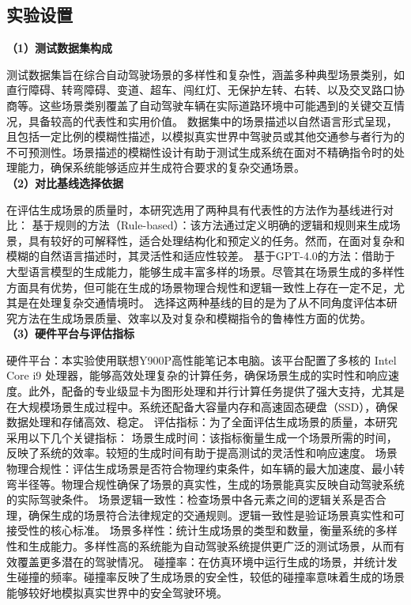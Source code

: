 \documentclass{article}
\begin{document}
\subsection{实验设置}
\textbf{（1）测试数据集构成} \par
测试数据集旨在综合自动驾驶场景的多样性和复杂性，涵盖多种典型场景类别，如直行障碍、转弯障碍、变道、超车、闯红灯、无保护左转、右转、以及交叉路口协商等。这些场景类别覆盖了自动驾驶车辆在实际道路环境中可能遇到的关键交互情况，具备较高的代表性和实用价值。
数据集中的场景描述以自然语言形式呈现，且包括一定比例的模糊性描述，以模拟真实世界中驾驶员或其他交通参与者行为的不可预测性。场景描述的模糊性设计有助于测试生成系统在面对不精确指令时的处理能力，确保系统能够适应并生成符合要求的复杂交通场景。\\
\indent\textbf{（2）对比基线选择依据} \par
在评估生成场景的质量时，本研究选用了两种具有代表性的方法作为基线进行对比：
基于规则的方法（Rule-based）：该方法通过定义明确的逻辑和规则来生成场景，具有较好的可解释性，适合处理结构化和预定义的任务。然而，在面对复杂和模糊的自然语言描述时，其灵活性和适应性较差。
基于GPT-4.0的方法：借助于大型语言模型的生成能力，能够生成丰富多样的场景。尽管其在场景生成的多样性方面具有优势，但可能在生成的场景物理合规性和逻辑一致性上存在一定不足，尤其是在处理复杂交通情境时。
选择这两种基线的目的是为了从不同角度评估本研究方法在生成场景质量、效率以及对复杂和模糊指令的鲁棒性方面的优势。\\
\indent\textbf{（3）硬件平台与评估指标} \par
硬件平台：本实验使用联想Y900P高性能笔记本电脑。该平台配置了多核的 Intel Core i9 处理器，能够高效处理复杂的计算任务，确保场景生成的实时性和响应速度。此外，配备的专业级显卡为图形处理和并行计算任务提供了强大支持，尤其是在大规模场景生成过程中。系统还配备大容量内存和高速固态硬盘（SSD），确保数据处理和存储高效、稳定。
评估指标：为了全面评估生成场景的质量，本研究采用以下几个关键指标：
场景生成时间：该指标衡量生成一个场景所需的时间，反映了系统的效率。较短的生成时间有助于提高测试的灵活性和响应速度。
场景物理合规性：评估生成场景是否符合物理约束条件，如车辆的最大加速度、最小转弯半径等。物理合规性确保了场景的真实性，生成的场景能真实反映自动驾驶系统的实际驾驶条件。
场景逻辑一致性：检查场景中各元素之间的逻辑关系是否合理，确保生成的场景符合法律规定的交通规则。逻辑一致性是验证场景真实性和可接受性的核心标准。
场景多样性：统计生成场景的类型和数量，衡量系统的多样性和生成能力。多样性高的系统能为自动驾驶系统提供更广泛的测试场景，从而有效覆盖更多潜在的驾驶情况。
碰撞率：在仿真环境中运行生成的场景，并统计发生碰撞的频率。碰撞率反映了生成场景的安全性，较低的碰撞率意味着生成的场景能够较好地模拟真实世界中的安全驾驶环境。
\end{document}
